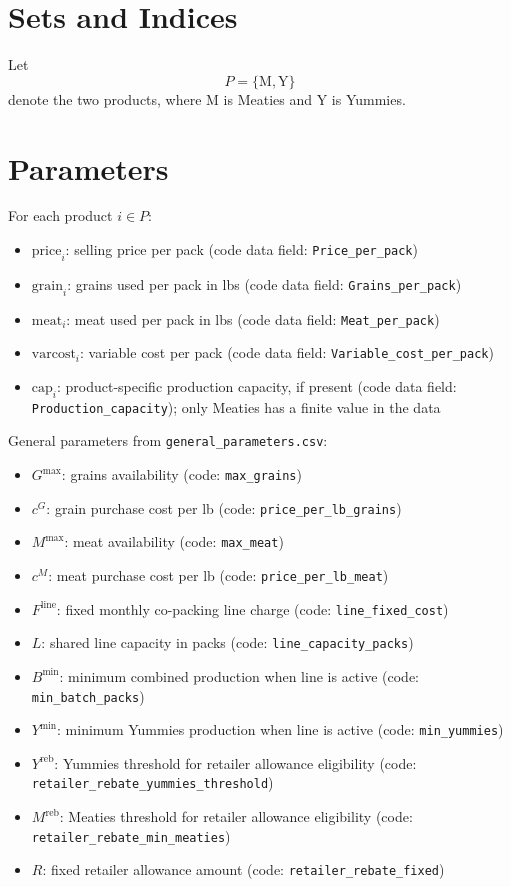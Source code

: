 \section*{Sets and Indices}

Let
\[
P=\{\mathrm{M},\mathrm{Y}\}
\]
denote the two products, where \(\mathrm{M}\) is Meaties and \(\mathrm{Y}\) is Yummies.

\section*{Parameters}

For each product \(i \in P\):
\begin{itemize}
    \item \(\text{price}_i\): selling price per pack (code data field: \texttt{Price\_per\_pack})
    \item \(\text{grain}_i\): grains used per pack in lbs (code data field: \texttt{Grains\_per\_pack})
    \item \(\text{meat}_i\): meat used per pack in lbs (code data field: \texttt{Meat\_per\_pack})
    \item \(\text{varcost}_i\): variable cost per pack (code data field: \texttt{Variable\_cost\_per\_pack})
    \item \(\text{cap}_i\): product-specific production capacity, if present (code data field: \texttt{Production\_capacity}); only Meaties has a finite value in the data
\end{itemize}

General parameters from \texttt{general\_parameters.csv}:
\begin{itemize}
    \item \(G^{\max}\): grains availability (code: \texttt{max\_grains})
    \item \(c^G\): grain purchase cost per lb (code: \texttt{price\_per\_lb\_grains})
    \item \(M^{\max}\): meat availability (code: \texttt{max\_meat})
    \item \(c^M\): meat purchase cost per lb (code: \texttt{price\_per\_lb\_meat})
    \item \(F^{\text{line}}\): fixed monthly co-packing line charge (code: \texttt{line\_fixed\_cost})
    \item \(L\): shared line capacity in packs (code: \texttt{line\_capacity\_packs})
    \item \(B^{\min}\): minimum combined production when line is active (code: \texttt{min\_batch\_packs})
    \item \(Y^{\min}\): minimum Yummies production when line is active (code: \texttt{min\_yummies})
    \item \(Y^{\text{reb}}\): Yummies threshold for retailer allowance eligibility (code: \texttt{retailer\_rebate\_yummies\_threshold})
    \item \(M^{\text{reb}}\): Meaties threshold for retailer allowance eligibility (code: \texttt{retailer\_rebate\_min\_meaties})
    \item \(R\): fixed retailer allowance amount (code: \texttt{retailer\_rebate\_fixed})
\end{itemize}

